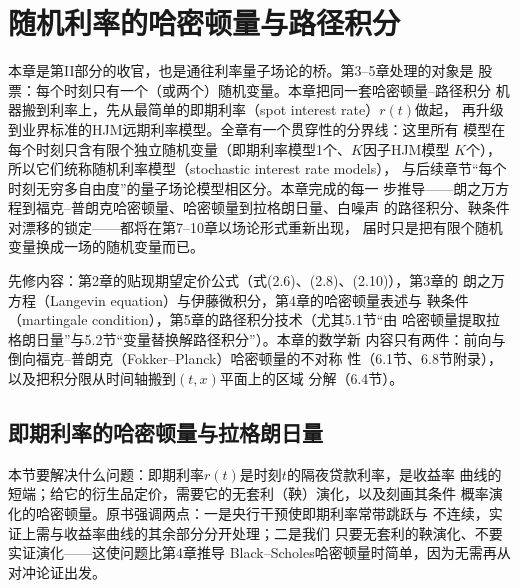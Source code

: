 \chapter{随机利率的哈密顿量与路径积分}

本章是第II部分的收官，也是通往利率量子场论的桥。第3--5章处理的对象是
股票：每个时刻只有一个（或两个）随机变量。本章把同一套哈密顿量--路径积分
机器搬到利率上，先从最简单的即期利率（spot interest rate）$r(t)$做起，
再升级到业界标准的HJM远期利率模型。全章有一个贯穿性的分界线：这里所有
模型在每个时刻只含有限个独立随机变量（即期利率模型1个、$K$因子HJM模型
$K$个），所以它们统称随机利率模型（stochastic interest rate models），
与后续章节“每个时刻无穷多自由度”的量子场论模型相区分。本章完成的每一
步推导——朗之万方程到福克--普朗克哈密顿量、哈密顿量到拉格朗日量、白噪声
的路径积分、鞅条件对漂移的锁定——都将在第7--10章以场论形式重新出现，
届时只是把有限个随机变量换成一场的随机变量而已。

先修内容：第2章的贴现期望定价公式（式(2.6)、(2.8)、(2.10)），第3章的
朗之万方程（Langevin equation）与伊藤微积分，第4章的哈密顿量表述与
鞅条件（martingale condition），第5章的路径积分技术（尤其5.1节“由
哈密顿量提取拉格朗日量”与5.2节“变量替换解路径积分”）。本章的数学新
内容只有两件：前向与倒向福克--普朗克（Fokker--Planck）哈密顿量的不对称
性（6.1节、6.8节附录），以及把积分限从时间轴搬到$(t,x)$平面上的区域
分解（6.4节）。

\section{即期利率的哈密顿量与拉格朗日量}

本节要解决什么问题：即期利率$r(t)$是时刻$t$的隔夜贷款利率，是收益率
曲线的短端；给它的衍生品定价，需要它的无套利（鞅）演化，以及刻画其条件
概率演化的哈密顿量。原书强调两点：一是央行干预使即期利率常带跳跃与
不连续，实证上需与收益率曲线的其余部分分开处理；二是我们
只要无套利的鞅演化、不要实证演化——这使问题比第4章推导
Black--Scholes哈密顿量时简单，因为无需再从对冲论证出发。

